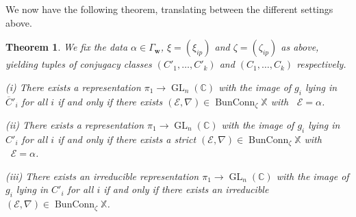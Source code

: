 \documentclass[12pt,a4paper]{amsart}
\theoremstyle{plain}
\newtheorem{thm}{Theorem}[section]
\newcommand{\C}{\mathbb C}
\DeclareMathOperator{\GL}{GL}
\DeclareMathOperator{\BunConn}{BunConn}
\DeclareMathOperator{\dimv}{\underline\dim}
\newcommand{\E}{\mathcal E}
\newcommand{\XX}{\mathbb X}
\newcommand{\bw}{\mathbf w}
\begin{document}
We now have the following theorem, translating between the different settings above.

\begin{thm}
We fix the data $\alpha\in\Gamma_\bw$, $\xi=(\xi_{ip})$ and $\zeta=(\zeta_{ip})$ as above, yielding tuples of conjugacy classes $(C'_1,\ldots,C'_k)$ and $(C_1,\ldots,C_k)$ respectively.

(i) There exists a representation $\pi_1\to\GL_n(\C)$ with the image of $g_i$ lying in $\overline C'_i$ for all $i$ if and only if there exists $(\E,\nabla)\in\BunConn_\zeta\XX$ with $\dimv\E=\alpha$.

(ii) There exists a representation $\pi_1\to\GL_n(\C)$ with the image of $g_i$ lying in $C'_i$ for all $i$ if and only if there exists a strict $(\E,\nabla)\in\BunConn_\zeta\XX$ with $\dimv\E=\alpha$.

(iii) There exists an irreducible representation $\pi_1\to\GL_n(\C)$ with the image of $g_i$ lying in $C'_i$ for all $i$ if and only if there exists an irreducible $(\E,\nabla)\in\BunConn_\zeta\XX$.
\end{thm}
\end{document}
